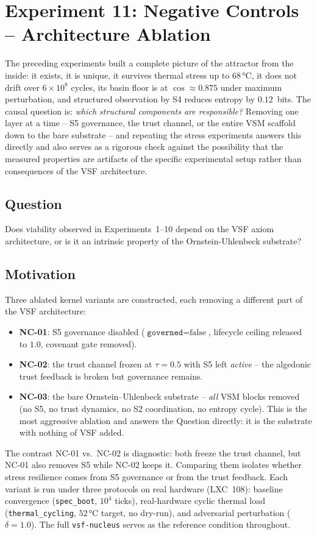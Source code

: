\documentclass[11pt, a4paper]{article}
\newcommand{\nucleus}{\texttt{vsf-nucleus}}
\begin{document}
\section{Experiment 11: Negative Controls -- Architecture Ablation}
\label{sec:negcontrols}

The preceding experiments built a complete picture of the attractor from
the inside: it exists, it is unique, it survives thermal stress up to 68\,°C,
it does not drift over $6\times 10^8$ cycles, its basin floor is at
$\cos \approx 0.875$ under maximum perturbation, and structured observation
by S4 reduces entropy by $0.12$~bits.
The causal question is: \emph{which structural components are responsible?}
Removing one layer at a time -- S5 governance, the trust channel, or the entire
VSM scaffold down to the bare substrate -- and repeating the stress experiments
answers this directly and also serves as a rigorous check against the
possibility that the measured properties are artifacts of the specific
experimental setup rather than consequences of the VSF architecture.

\subsection*{Question}
Does viability observed in Experiments~1--10 depend on the VSF axiom architecture,
or is it an intrinsic property of the Ornstein-Uhlenbeck substrate?

\subsection{Motivation}

Three ablated kernel variants are constructed, each removing a different part of
the VSF architecture:
\begin{itemize}
  \item \textbf{NC-01}: S5 governance disabled ($\texttt{governed}=\text{false}$,
        lifecycle ceiling released to $1.0$, covenant gate removed).
  \item \textbf{NC-02}: the trust channel frozen at $\tau = 0.5$ with S5 left
        \emph{active} -- the algedonic trust feedback is broken but governance
        remains.
  \item \textbf{NC-03}: the bare Ornstein--Uhlenbeck substrate -- \emph{all} VSM
        blocks removed (no S5, no trust dynamics, no S2 coordination, no entropy
        cycle). This is the most aggressive ablation and answers the Question
        directly: it is the substrate with nothing of VSF added.
\end{itemize}
The contrast NC-01 vs.\ NC-02 is diagnostic: both freeze the trust channel, but
NC-01 also removes S5 while NC-02 keeps it. Comparing them isolates whether
stress resilience comes from S5 governance or from the trust feedback.
Each variant is run under three protocols on real hardware (LXC~108): baseline
convergence (\texttt{spec\_boot}, $10^4$ ticks), real-hardware cyclic thermal
load (\texttt{thermal\_cycling}, $52$\,°C target, no dry-run), and adversarial
perturbation ($\delta = 1.0$).
The full \nucleus{} serves as the reference condition throughout.
\end{document}
